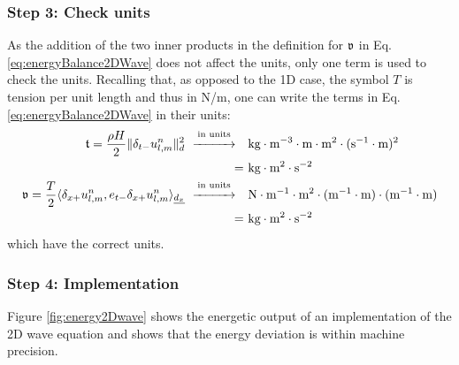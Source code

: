 \subsubsection{Step 3: Check units}
As the addition of the two inner products in the definition for $\mathfrak{v}$ in Eq. \eqref{eq:energyBalance2DWave} does not affect the units, only one term is used to check the units. Recalling that, as opposed to the 1D case, the symbol $T$ is tension per unit length and thus in N/m, one can write the terms in Eq. \eqref{eq:energyBalance2DWave} in their units:
\begin{align*}
    \mathfrak{t} = \frac{\rho H}{2}\lVert \delta_{t-} u_{l,m}^n\rVert^2_d \
    \overset{\text{in units}}{\xrightarrow{\hspace*{1cm}}}    \quad&\text{kg}\cdot\text{m}^{-3}\cdot\text{m}\cdot\text{m}^2\cdot(\text{s}^{-1}\cdot\text{m})^2 \\
    = \ & \text{kg}\cdot\text{m}^2\cdot\text{s}^{-2}\\
    \mathfrak{v} =\frac{T}{2} \langle \delta_{x+} u_{l,m}^n, e_{t-}\delta_{x+} u_{l,m}^n\rangle_{\underline{d_x}} \
     \overset{\text{in units}}{\xrightarrow{\hspace*{1cm}}} \quad& \text{N} \cdot \text{m}^{-1}\cdot\text{m}^2\cdot(\text{m}^{-1}\cdot\text{m})\cdot(\text{m}^{-1}\cdot\text{m})\nonumber \\
    = \ &\text{kg}\cdot\text{m}^2\cdot\text{s}^{-2}
\end{align*}
which have the correct units. 

\subsubsection{Step 4: Implementation}
Figure \ref{fig:energy2Dwave} shows the energetic output of an implementation of the 2D wave equation and shows that the energy deviation is within machine precision.

